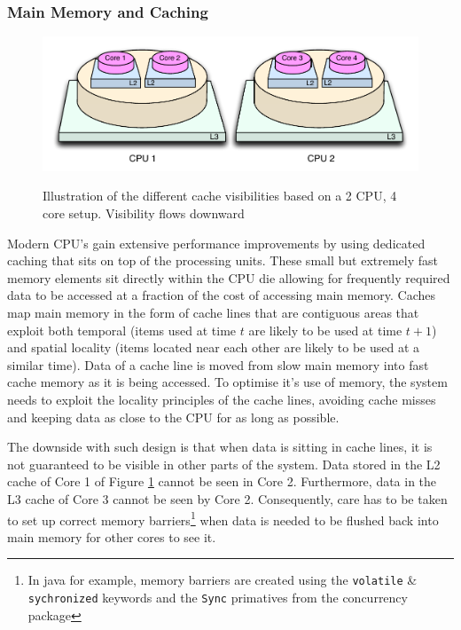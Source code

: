 \documentclass[a4paper,11pt]{scrreprt}
\begin{document}
\subsubsection{Main Memory and Caching}
\begin{figure}[h]
\centering
\caption{Illustration of the different cache visibilities based on a 2 CPU, 4 core setup. Visibility flows downward}
\includegraphics[scale=0.65] {cachelevels.pdf}
\label{fig:corecachedesign}
\end{figure}
Modern CPU's gain extensive performance improvements by using dedicated caching that sits on top of the processing units. These small but extremely fast memory elements sit directly within the CPU die allowing for frequently required data to be accessed at a fraction of the cost of accessing main memory. Caches map main memory in the form of cache lines that are contiguous areas that exploit both temporal (items used at time \(t\) are likely to be used at time \(t+1\)) and spatial locality (items located near each other are likely to be used at a similar time). Data of a cache line is moved from slow main memory into fast cache memory as it is being accessed. To optimise it's use of memory, the system needs to exploit the locality principles of the cache lines, avoiding cache misses and keeping data as close to the CPU for as long as possible. 

The downside with such design is that when data is sitting in cache lines, it is not guaranteed to be visible in other parts of the system. Data stored in the L2 cache of Core 1 of Figure \ref{fig:corecachedesign} cannot be seen in Core 2. Furthermore, data in the L3 cache of Core 3 cannot be seen by Core 2. Consequently, care has to be taken to set up correct memory barriers\footnote{In java for example, memory barriers are created using the \texttt{volatile} \& \texttt{sychronized} keywords and the \texttt{Sync} primatives from the concurrency package} when data is needed to be flushed back into main memory for other cores to see it.
\end{document}

